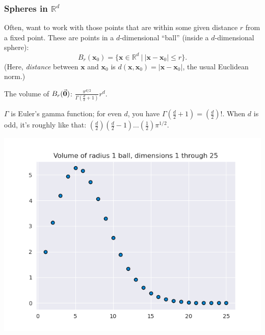 \documentclass[smaller]{beamer}
\theoremstyle{example}
\newcommand{\x}{\textbf{x}}
\begin{document}
\begin{frame}
    \frametitle{Spheres in $\mathbb R^d$}
    Often, want to work with those points that are within some given distance $r$ from a fixed point. These are points in a $d$-dimensional ``ball'' (inside a $d$-dimensional sphere): 
            \[B_r(\x_0) = \{\x\in\mathbb R^d\ |\ |\x - \x_0| \le r\}.\]
    (Here, \textit{distance} between $\x$ and $\x_0$ is $d(\x, \x_0) = |\x-\x_0|$, the usual Euclidean norm.)

    The volume of $B_r(\vec{{\bf 0}})$: \qquad $\frac{\pi^{d/2}}{\Gamma(\frac{d}{2} + 1)}r^d$.

    $\Gamma$ is Euler's gamma function; for even $d$, you have $\Gamma(\frac{d}{2}+1) = (\frac{d}{2})!$. When $d$ is odd, it's roughly like that: $(\frac{d}{2})(\frac{d}{2}-1)\ldots(\frac12)\pi^{1/2}$.

    \centering
    \includegraphics[height = 0.3\textheight]{../../Images/UnitBallVolume.png}

\end{frame}
\end{document}
